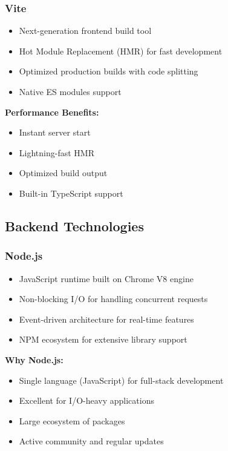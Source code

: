 \documentclass[12pt,a4paper]{article}
\begin{document}
\subsubsection{Vite}
\begin{itemize}
    \item Next-generation frontend build tool
    \item Hot Module Replacement (HMR) for fast development
    \item Optimized production builds with code splitting
    \item Native ES modules support
\end{itemize}

\textbf{Performance Benefits:}
\begin{itemize}
    \item Instant server start
    \item Lightning-fast HMR
    \item Optimized build output
    \item Built-in TypeScript support
\end{itemize}

\subsection{Backend Technologies}

\subsubsection{Node.js}
\begin{itemize}
    \item JavaScript runtime built on Chrome V8 engine
    \item Non-blocking I/O for handling concurrent requests
    \item Event-driven architecture for real-time features
    \item NPM ecosystem for extensive library support
\end{itemize}

\textbf{Why Node.js:}
\begin{itemize}
    \item Single language (JavaScript) for full-stack development
    \item Excellent for I/O-heavy applications
    \item Large ecosystem of packages
    \item Active community and regular updates
\end{itemize}
\end{document}
